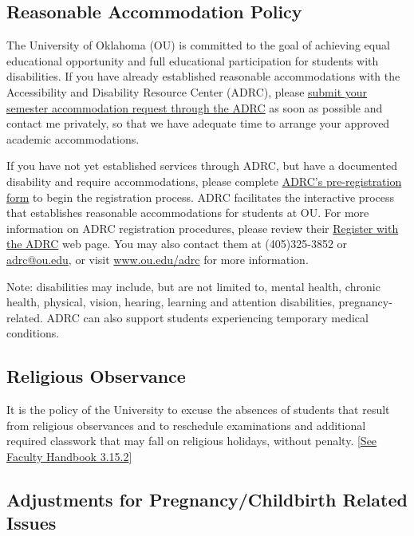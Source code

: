 \documentclass[11pt,english]{article}
\begin{document}
\subsection*{Reasonable Accommodation Policy}

The University of Oklahoma (OU) is committed to the goal of achieving equal educational opportunity and full educational participation for students with disabilities. If you have already established reasonable accommodations with the Accessibility and Disability Resource Center (ADRC), please \href{https://www.ou.edu/adrc/students/adrc-registered-students/accommodation-request}{submit your semester accommodation request through the ADRC} as soon as possible and contact me privately, so that we have adequate time to arrange your approved academic accommodations.

If you have not yet established services through ADRC, but have a documented disability and require accommodations, please complete \href{https://forms.office.com/pages/responsepage.aspx?id=neB9nDSQwUS0YsRk_s4gSiXtB4DC5XxJhwAGd7Un1f5UNFU2WDE3UEVENTFIMkgyWFkzV0lGM1NPVCQlQCN0PWcu}{ADRC's pre-registration form} to begin the registration process. ADRC facilitates the interactive process that establishes reasonable accommodations for students at OU. For more information on ADRC registration procedures, please review their \href{https://www.ou.edu/adrc/about/registering-with-the-adrc}{Register with the ADRC} web page. You may also contact them at (405)325-3852 or \href{mailto:adrc@ou.edu}{adrc@ou.edu}, or visit \url{www.ou.edu/adrc} for more information.

Note: disabilities may include, but are not limited to, mental health, chronic health, physical, vision, hearing, learning and attention disabilities, pregnancy-related. ADRC can also support students experiencing temporary medical conditions.

\subsection*{Religious Observance}

It is the policy of the University to excuse the absences of students that result from religious observances and to reschedule examinations and additional required classwork that may fall on religious holidays, without penalty. [\href{https://apps.hr.ou.edu/FacultyHandbook/#3.15.2}{See Faculty Handbook 3.15.2}]

\subsection*{Adjustments for Pregnancy/Childbirth Related Issues}
\end{document}
